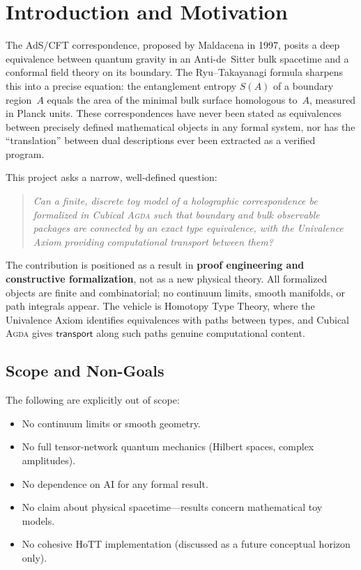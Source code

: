\documentclass[11pt, a4paper]{article}
\theoremstyle{plain}
\theoremstyle{definition}
\newcommand{\Agda}{\textsc{Agda}}
\newcommand{\RT}{Ryu--Takayanagi}
\newcommand{\transport}{\mathsf{transport}}
\begin{document}
\tableofcontents

\section{Introduction and Motivation}
\label{sec:intro}

The AdS/CFT correspondence, proposed by Maldacena in 1997, posits
a deep equivalence between quantum gravity in an
Anti-de~Sitter bulk spacetime and a conformal field theory on its
boundary.  The \RT{} formula sharpens this into a precise equation:
the entanglement entropy $S(A)$ of a boundary region~$A$ equals the
area of the minimal bulk surface homologous to~$A$, measured in
Planck units.  These correspondences have never been stated as
equivalences between precisely defined mathematical objects in any
formal system, nor has the ``translation'' between dual descriptions
ever been extracted as a verified program.

This project asks a narrow, well-defined question:

\begin{quote}
\emph{Can a finite, discrete toy model of a holographic
correspondence be formalized in Cubical \Agda{} such that boundary
and bulk observable packages are connected by an exact type
equivalence, with the Univalence Axiom providing computational
transport between them?}
\end{quote}

The contribution is positioned as a result in \textbf{proof
engineering and constructive formalization}, not as a new physical
theory.  All formalized objects are finite and combinatorial; no
continuum limits, smooth manifolds, or path integrals appear.  The
vehicle is Homotopy Type Theory, where the Univalence Axiom
identifies equivalences with paths between types, and Cubical
\Agda{} gives $\transport$ along such paths genuine computational
content.

\subsection{Scope and Non-Goals}

The following are explicitly out of scope:
\begin{itemize}[nosep]
  \item No continuum limits or smooth geometry.
  \item No full tensor-network quantum mechanics (Hilbert spaces,
    complex amplitudes).
  \item No dependence on AI for any formal result.
  \item No claim about physical spacetime---results concern
    mathematical toy models.
  \item No cohesive HoTT implementation (discussed as a future
    conceptual horizon only).
\end{itemize}
\end{document}
